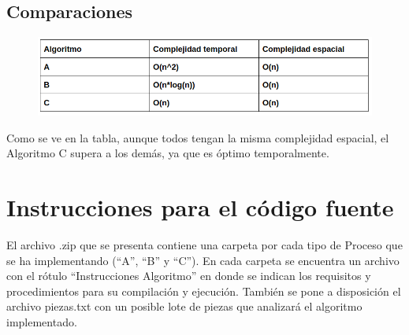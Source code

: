\documentclass{article}
\begin{document}
\subsection{Comparaciones}

\begin{figure}[h!]
    \includegraphics[width=\linewidth]{comparacion.png}
\end{figure}


Como se ve en la tabla, aunque todos tengan la misma complejidad espacial, el Algoritmo C supera a los demás, ya que es óptimo temporalmente.


\section{Instrucciones para el código fuente}


El archivo .zip que se presenta contiene una carpeta por cada tipo de Proceso que se ha implementando (“A”, “B” y “C”). En cada carpeta se encuentra un archivo con el rótulo “Instrucciones Algoritmo” en donde se indican los requisitos y procedimientos para su compilación y ejecución. 
También se pone a disposición el archivo piezas.txt con un posible lote de piezas que analizará el algoritmo implementado.
\end{document}
